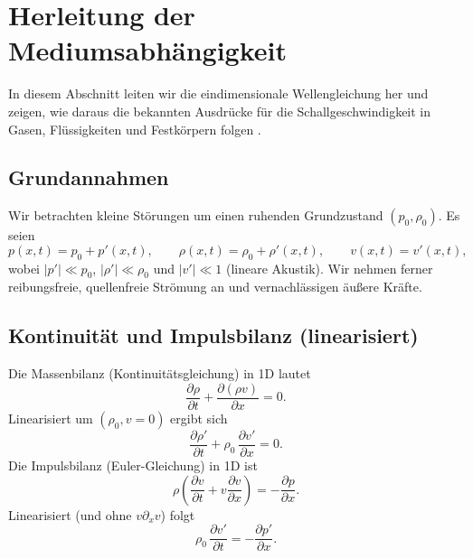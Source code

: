 %
%
%
%
\section{Herleitung der Mediumsabhängigkeit
\label{schall:section:teil1}}


In diesem Abschnitt leiten wir die eindimensionale Wellengleichung her
und zeigen, wie daraus die bekannten Ausdrücke für die Schallgeschwindigkeit
in Gasen, Flüssigkeiten und Festkörpern folgen
\cite{schall:kinsler,schall:landaulifschitz}.

\subsection{Grundannahmen}
Wir betrachten kleine Störungen um einen ruhenden Grundzustand $(p_0,\rho_0)$.
Es seien
\[
    p(x,t)=p_0+p'(x,t),\qquad \rho(x,t)=\rho_0+\rho'(x,t),\qquad v(x,t)=v'(x,t),
\]
wobei $|p'|\ll p_0$, $|\rho'|\ll \rho_0$ und $|v'|\ll 1$ (lineare Akustik).
Wir nehmen ferner reibungsfreie, quellenfreie Strömung an und
vernachlässigen äußere Kräfte.

\subsection{Kontinuität und Impulsbilanz (linearisiert)}
Die Massenbilanz (Kontinuitätsgleichung) in 1D lautet
\begin{equation}
    \frac{\partial \rho}{\partial t}+\frac{\partial(\rho v)}{\partial x}=0.
\end{equation}
Linearisiert um $(\rho_0, v=0)$ ergibt sich
\begin{equation}
    \frac{\partial \rho'}{\partial t}+\rho_0\,\frac{\partial v'}{\partial x}=0.
    \label{eq:lin-cont}
\end{equation}
Die Impulsbilanz (Euler-Gleichung) in 1D ist
\begin{equation}
    \rho\left(\frac{\partial v}{\partial t}+
    v\frac{\partial v}{\partial x}\right)=
    -\frac{\partial p}{\partial x}.
\end{equation}
Linearisiert (und ohne $v\partial_x v$) folgt
\begin{equation}
    \rho_0\,\frac{\partial v'}{\partial t}=
    -\frac{\partial p'}{\partial x}.
    \label{eq:lin-mom}
\end{equation}

